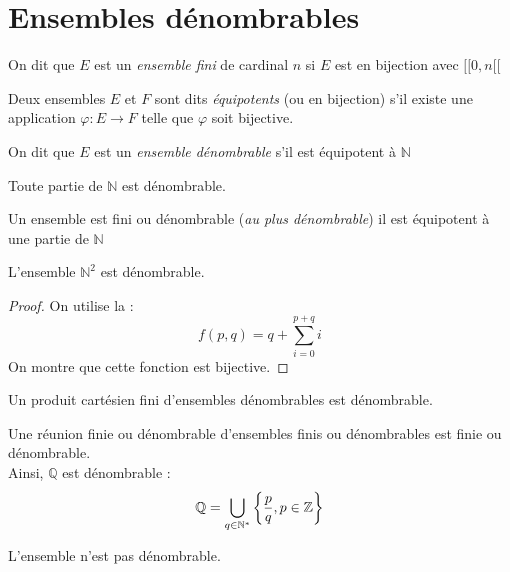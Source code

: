 \documentclass[11pt,a4paper,fleqn,pdftex]{report}
\begin{document}
\section{Ensembles dénombrables} %
\label{sec:denombrement}
\begin{dfn}
     On dit que $E$ est un \emph{ensemble fini} de cardinal $n$ si $E$ est en bijection avec $[\![ 0 , n [\![$
\end{dfn}
\begin{dfn}[Equipotence]
     Deux ensembles $E$ et $F$ sont dits \emph{équipotents} (ou en bijection) s'il existe une application $\varphi : E \to F$ telle que $\varphi$ soit bijective.
\end{dfn}
\begin{dfn}
     On dit que $E$ est un \emph{ensemble dénombrable} s'il est équipotent à $\mathbb{N}$
\end{dfn}
\begin{theorem}
     Toute partie  de $\mathbb{N}$ est dénombrable.
\end{theorem}
\begin{theorem}
     Un ensemble est fini ou dénombrable (\emph{au plus dénombrable})  il est équipotent à une partie de $\mathbb{N}$
\end{theorem}
\begin{itheorem}
     L'ensemble $\mathbb{N}^2$ est dénombrable.
\end{itheorem}
\begin{proof}
     On utilise la  : 
     \begin{equation}
     f(p,q) = q + \sum_{i=0}^{p+q} i
     \end{equation}
     On montre que cette fonction est bijective.
\end{proof}
\begin{dfn}
     Un produit cartésien fini d'ensembles dénombrables est dénombrable.
\end{dfn}
\begin{theorem}
     Une réunion finie ou dénombrable d'ensembles finis ou  dénombrables est finie ou  dénombrable.\\[5mm]
     Ainsi, $\mathbb{Q}$ est dénombrable : \[\mathbb{Q} = \bigcup_{q\in\mathbb{N}^*}\left\lbrace \vphantom{\mathbb{N}} \frac{p}{q}, p \in \mathbb{Z} \right\rbrace\]
\end{theorem}
\begin{theorem}
     L'ensemble \Reel{} n'est pas dénombrable.
\end{theorem}
\end{document}

